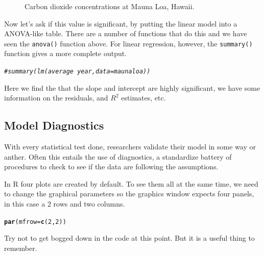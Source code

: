\documentclass{article}\usepackage[]{graphicx}\usepackage[]{color}
\makeatletter
\newcommand{\hlnum}[1]{\textcolor[rgb]{0.686,0.059,0.569}{#1}}%
\newcommand{\hlcom}[1]{\textcolor[rgb]{0.678,0.584,0.686}{\textit{#1}}}%
\newcommand{\hlstd}[1]{\textcolor[rgb]{0.345,0.345,0.345}{#1}}%
\newcommand{\hlkwc}[1]{\textcolor[rgb]{0.333,0.667,0.333}{#1}}%
\newcommand{\hlkwd}[1]{\textcolor[rgb]{0.737,0.353,0.396}{\textbf{#1}}}%
\newenvironment{kframe}{%
 \def\at@end@of@kframe{}%
 \ifinner\ifhmode%
  \def\at@end@of@kframe{\end{minipage}}%
  \begin{minipage}{\columnwidth}%
 \fi\fi%
 \def\FrameCommand##1{\hskip\@totalleftmargin \hskip-\fboxsep
 \colorbox{shadecolor}{##1}\hskip-\fboxsep
     \hskip-\linewidth \hskip-\@totalleftmargin \hskip\columnwidth}%
 \MakeFramed {\advance\hsize-\width
   \@totalleftmargin\z@ \linewidth\hsize
   \@setminipage}}%
 {\par\unskip\endMakeFramed%
 \at@end@of@kframe}
\newenvironment{knitrout}{}{} %
\makeatother
\begin{document}
\begin{figure}
\label{fig:xxtest}
\caption{Carbon dioxide concentrations at Mauna Loa, Hawaii.}

\end{figure}

Now let's ask if this value is significant, by putting the linear model into a ANOVA-like table. There are a number of functions that do this and we have seen the \texttt{anova()} function above. For linear regression, however, the \texttt{summary()} function gives a more complete output.

\begin{knitrout}
\color{fgcolor}\begin{kframe}
\begin{alltt}
\hlcom{#summary(lm(average ~ year, data=maunaloa))}
\end{alltt}
\end{kframe}
\end{knitrout}

Here we find the that the slope and intercept are highly significant, we have some information on the residuals, and $R^2$ estimates, etc.


\subsection{Model Diagnostics}

With every statistical test done, researchers validate their model in some way or anther. Often this entails the use of diagnostics, a standardize battery of procedures to check to see if the data are following the assumptions. 

In R four plots are created by default.  To see them all at the same time, we need to change the graphical parameters so the graphics window expects four panels, in this case a 2 rows and two columns. 

\begin{knitrout}
\color{fgcolor}\begin{kframe}
\begin{alltt}
\hlkwd{par}\hlstd{(}\hlkwc{mfrow}\hlstd{=}\hlkwd{c}\hlstd{(}\hlnum{2}\hlstd{,}\hlnum{2}\hlstd{))}
\end{alltt}
\end{kframe}
\end{knitrout}

Try not to get bogged down in the code at this point. But it is a useful thing to remember.
\end{document}
